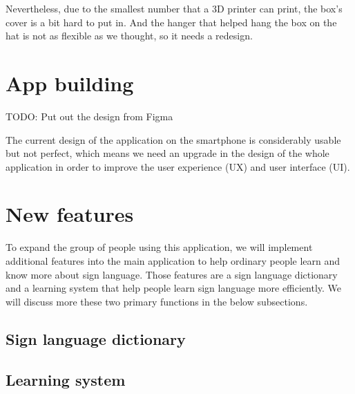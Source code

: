 Nevertheless, due to the smallest number that a 3D printer can print, the box's cover is a bit hard to put in. And the hanger that helped hang the box on the hat is not as flexible as we thought, so it needs a redesign.

\section{App building}

TODO: Put out the design from Figma

The current design of the application on the smartphone is considerably usable but not perfect, which means we need an upgrade in the design of the whole application in order to improve the user experience (UX) and user interface (UI).

\section{New features}

To expand the group of people using this application, we will implement additional features into the main application to help ordinary people learn and know more about sign language. Those features are a sign language dictionary and a learning system that help people learn sign language more efficiently. We will discuss more these two primary functions in the below subsections.

\subsection{Sign language dictionary}


\subsection{Learning system}

